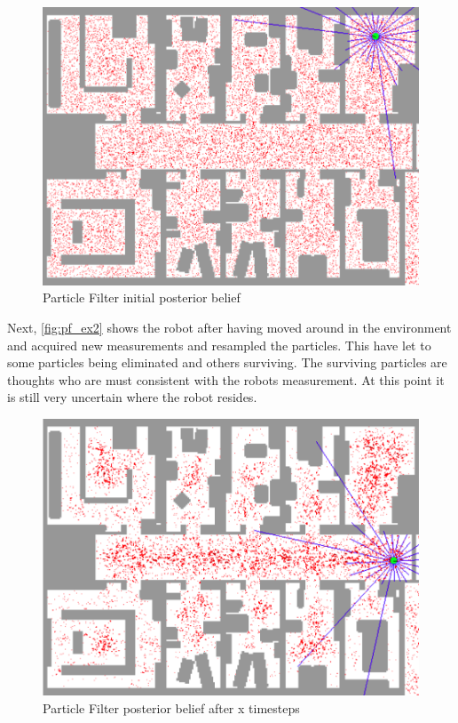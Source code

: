 \begin{figure}[H]
\centering
\includegraphics[scale=0.35]{images/particlefilter1}
\caption{Particle Filter initial posterior belief}
\label{fig:pf_ex1}
\end{figure}

Next, \autoref{fig:pf_ex2} shows the robot after having moved around in the environment and acquired new measurements and resampled the particles. This have let to some particles being eliminated and others surviving. The surviving particles are thoughts who are must consistent with the robots measurement. At this point it is still very uncertain where the robot resides.

\begin{figure}[H]
\centering
\includegraphics[scale=0.35]{images/particlefilter2}
\caption{Particle Filter posterior belief after x timesteps}
\label{fig:pf_ex2}
\end{figure}

